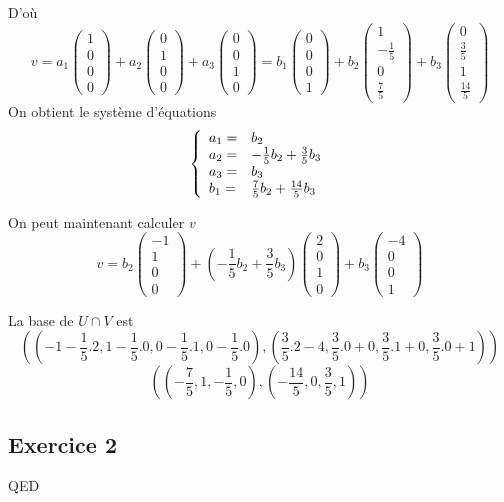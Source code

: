 \documentclass[]{book}
\theoremstyle{definition}
\begin{document}
D'o\`u
$$
v= 
a_1\begin{pmatrix}1\\0\\0\\0\end{pmatrix}+a_2\begin{pmatrix}0\\1\\0\\0\end{pmatrix}+a_3\begin{pmatrix}0\\0\\1\\0\end{pmatrix}
= b_1\begin{pmatrix}0\\0\\0\\1\end{pmatrix}+b_2\begin{pmatrix}1\\-\frac{1}{5}\\0\\\frac{7}{5}\end{pmatrix}+b_3\begin{pmatrix}0\\\frac{3}{5}\\1\\\frac{14}{5}\end{pmatrix}
$$
On obtient le syst\`eme d'\'equations
$$
\left\{ 
\begin{array}{l l}
a_1 =  & b_2\\
a_2 = & -\frac{1}{5}b_2+\frac{3}{5}b_3\\
a_3 = & b_3\\
b_1 = & \frac{7}{5}b_2 + \frac{14}{5}b_3\\
\end{array}
\right. 
$$ 

On peut maintenant calculer $v$
$$
v= 
b_2\begin{pmatrix}-1\\1\\0\\0\end{pmatrix}+(-\frac{1}{5}b_2+\frac{3}{5}b_3)\begin{pmatrix}2\\0\\1\\0\end{pmatrix}+b_3\begin{pmatrix}-4\\0\\0\\1\end{pmatrix}
$$

La base de $U \cap V$ est 
$$((-1-\frac{1}{5}.2, 1-\frac{1}{5}.0,0-\frac{1}{5}.1,0-\frac{1}{5}.0),(\frac{3}{5}.2-4, \frac{3}{5}.0+0, \frac{3}{5}.1+0, \frac{3}{5}.0+1))$$
$$((-\frac{7}{5},1,-\frac{1}{5},0),(-\frac{14}{5}, 0, \frac{3}{5}, 1))$$  

\subsection*{Exercice 2}


QED
\end{document}
